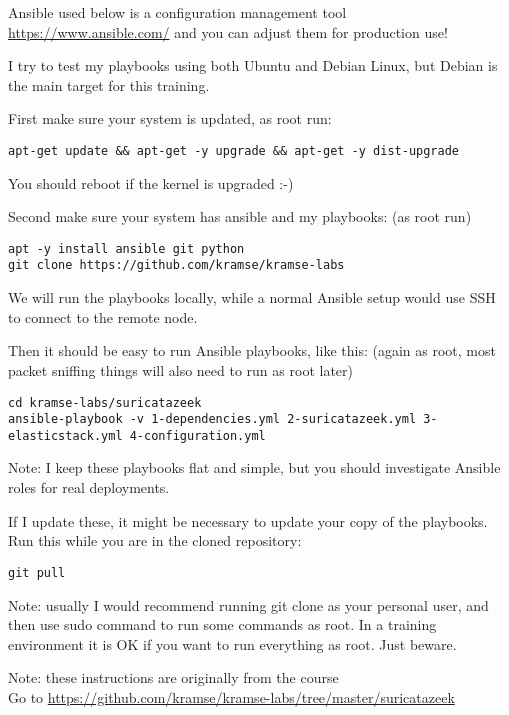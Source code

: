 \documentclass[a4paper,11pt,notitlepage]{report}
\begin{document}
Ansible used below is a configuration management tool \url{https://www.ansible.com/} and you can adjust them for production use!

I try to test my playbooks using both Ubuntu and Debian Linux, but Debian is the main target for this training.

First make sure your system is updated, as root run:

\begin{verbatim}
apt-get update && apt-get -y upgrade && apt-get -y dist-upgrade
\end{verbatim}

You should reboot if the kernel is upgraded :-)

Second make sure your system has ansible and my playbooks: (as root run)
\begin{verbatim}
apt -y install ansible git python
git clone https://github.com/kramse/kramse-labs
\end{verbatim}

We will run the playbooks locally, while a normal Ansible setup would use SSH to connect to the remote node.

Then it should be easy to run Ansible playbooks, like this: (again as root, most packet sniffing things will also need to run as root later)

\begin{verbatim}
cd kramse-labs/suricatazeek
ansible-playbook -v 1-dependencies.yml 2-suricatazeek.yml 3-elasticstack.yml 4-configuration.yml
\end{verbatim}

Note: I keep these playbooks flat and simple, but you should investigate Ansible roles for real deployments.

If I update these, it might be necessary to update your copy of the playbooks. Run this while you are in the cloned repository:

\begin{verbatim}
git pull
\end{verbatim}

Note: usually I would recommend running git clone as your personal user, and then use sudo command to run some commands as root. In a training environment it is OK if you want to run everything as root. Just beware.

Note: these instructions are originally from the course\\
Go to \url{https://github.com/kramse/kramse-labs/tree/master/suricatazeek}
\end{document}
